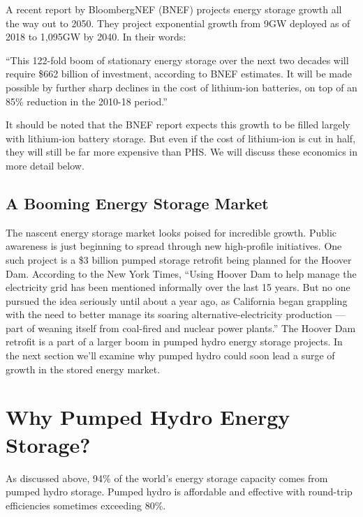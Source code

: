 \documentclass[hidelinks,12pt,a4paper]{article}
\begin{document}
A recent report by BloombergNEF (BNEF) projects energy storage growth all the way out to 2050. They project exponential growth from 9GW deployed as of 2018 to 1,095GW by 2040. In their words:

\begin{displayquote}
“This 122-fold boom of stationary energy storage over the next two decades will require \$662 billion of investment, according to BNEF estimates. It will be made possible by further sharp declines in the cost of lithium-ion batteries, on top of an 85\% reduction in the 2010-18 period.” \cite{EnergyStorageInvestmentsBoom}
\end{displayquote}

It should be noted that the BNEF report expects this growth to be filled largely with lithium-ion battery storage. But even if the cost of lithium-ion is cut in half, they will still be far more expensive than PHS. We will discuss these economics in more detail below.


\subsection{A Booming Energy Storage Market}
The nascent energy storage market looks poised for incredible growth. Public awareness is just beginning to spread through new high-profile initiatives. One such project is a \$3 billion pumped storage retrofit being planned for the Hoover Dam. According to the New York Times, “Using Hoover Dam to help manage the electricity grid has been mentioned informally over the last 15 years. But no one pursued the idea seriously until about a year ago, as California began grappling with the need to better manage its soaring alternative-electricity production — part of weaning itself from coal-fired and nuclear power plants.” \cite{The3BillionPlanToTurnHooverDamIntoAGiantBattery} The Hoover Dam retrofit is a part of a larger boom in pumped hydro energy storage projects. In the next section we'll examine why pumped hydro could soon lead a surge of growth in the stored energy market.

\pagebreak[1]
\section{Why Pumped Hydro Energy Storage?}
As discussed above, 94\% of the world's energy storage capacity comes from pumped hydro storage. \cite{ElectricStorageCapacityInTheUnitedStates} Pumped hydro is affordable and effective with round-trip efficiencies sometimes exceeding 80\%. \cite{ESAPumpedHydroelectricStorage}
\end{document}
